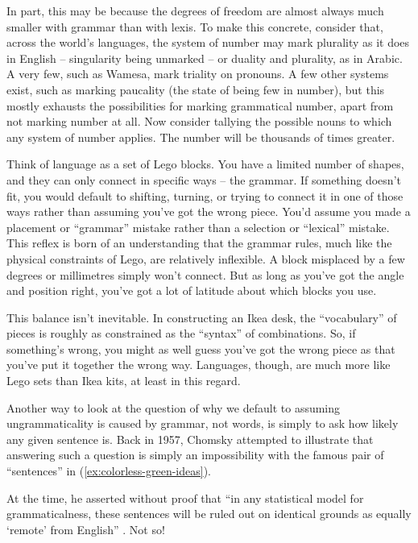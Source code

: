 In part, this may be because the degrees of freedom are almost always much smaller with grammar than with lexis. To make this concrete, consider that, across the world's languages, the system of number may mark plurality as it does in English -- singularity being unmarked -- or duality and plurality, as in Arabic. A very few, such as Wamesa, mark triality on pronouns. %
A few other systems exist, such as marking paucality (the state of being few in number), but this mostly exhausts the possibilities for marking grammatical number, apart from not marking number at all. Now consider tallying the possible nouns to which any system of number applies. The number will be thousands of times greater.

Think of language as a set of Lego blocks. You have a limited number of shapes, and they can only connect in specific ways -- the grammar. If something doesn't fit, you would default to shifting, turning, or trying to connect it in one of those ways rather than assuming you've got the wrong piece. You'd assume you made a placement or \enquote{grammar} mistake rather than a selection or \enquote{lexical} mistake. This reflex is born of an understanding that the grammar rules, much like the physical constraints of Lego, are relatively inflexible. A block misplaced by a few degrees or millimetres simply won't connect. But as long as you've got the angle and position right, you've got a lot of latitude about which blocks you use.

This balance isn't inevitable. In constructing an Ikea desk, the \enquote{vocabulary} of pieces is roughly as constrained as the \enquote{syntax} of combinations. So, if something's wrong, you might as well guess you've got the wrong piece as that you've put it together the wrong way. Languages, though, are much more like Lego sets than Ikea kits, at least in this regard.

Another way to look at the question of why we default to assuming ungrammaticality is caused by grammar, not words, is simply to ask how likely any given sentence is. Back in 1957, Chomsky attempted to illustrate that answering such a question is simply an impossibility with the famous pair of \enquote{sentences} in (\ref{ex:colorless-green-ideas}).

\ea \label{ex:colorless-green-ideas}
    \z
\z

At the time, he asserted without proof that \enquote{in any statistical model for grammaticalness, these sentences will be ruled out on identical grounds as equally \enquote{remote} from English} \citep[15]{Chomsky1957}. Not so!

